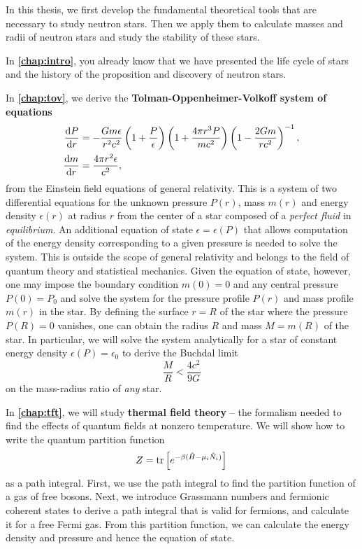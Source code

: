 In this thesis, we first develop the fundamental theoretical tools that are necessary to study neutron stars.
Then we apply them to calculate masses and radii of neutron stars and study the stability of these stars.

In \textbf{\cref{chap:intro}}, you already know that we have presented the life cycle of stars and the history of the proposition and discovery of neutron stars.

In \textbf{\cref{chap:tov}}, we derive the \textbf{Tolman-Oppenheimer-Volkoff system of equations}
\begin{align*}
	\odv{P}{r} &= -\frac{G m \epsilon}{r^2 c^2} \left( 1 + \frac{P}{\epsilon} \right) \left( 1 + \frac{4 \pi r^3 P}{m c^2} \right) \left( 1 - \frac{2 G m}{r c^2} \right)^{-1} , \\
	\odv{m}{r} &= \frac{4 \pi r^2 \epsilon}{c^2} ,
\end{align*}
from the Einstein field equations of general relativity.
This is a system of two differential equations for the unknown pressure $P(r)$, mass $m(r)$ and energy density $\epsilon(r)$ at radius $r$ from the center of a star composed of a \emph{perfect fluid} in \emph{equilibrium}.
An additional equation of state $\epsilon = \epsilon(P)$ that allows computation of the energy density corresponding to a given pressure is needed to solve the system.
This is outside the scope of general relativity and belongs to the field of quantum theory and statistical mechanics.
Given the equation of state, however, one may impose the boundary condition $m(0) = 0$ and any central pressure $P(0) = P_0$ and solve the system for the pressure profile $P(r)$ and mass profile $m(r)$ in the star.
By defining the surface $r=R$ of the star where the pressure $P(R) = 0$ vanishes, one can obtain the radius $R$ and mass $M = m(R)$ of the star.
In particular, we will solve the system analytically for a star of constant energy density $\epsilon(P) = \epsilon_0$ to derive the Buchdal limit
\begin{equation*}
	\frac{M}{R} < \frac{4 c^2}{9 G}
\end{equation*}
on the mass-radius ratio of \emph{any} star.

In \textbf{\cref{chap:tft}}, we will study \textbf{thermal field theory} -- the formalism needed to find the effects of quantum fields at nonzero temperature.
We will show how to write the quantum partition function
\begin{equation*}
	Z = \text{tr} \left[ e^{-\beta(\hat{H} - \mu_i \hat{N}_i)} \right]
\end{equation*}
as a path integral.
First, we use the path integral to find the partition function of a gas of free bosons.
Next, we introduce Grassmann numbers and fermionic coherent states to derive a path integral that is valid for fermions, and calculate it for a free Fermi gas.
From this partition function, we can calculate the energy density and pressure and hence the equation of state.

